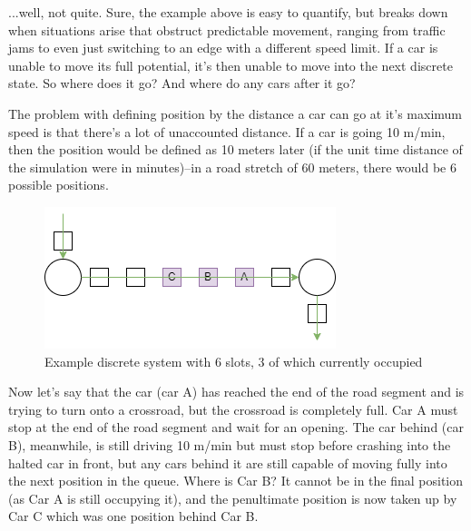 \par ...well, not quite.  Sure, the example above is easy to quantify, but breaks down when situations arise that obstruct predictable movement, ranging from traffic jams to even just switching to an edge with a different speed limit.  If a car is unable to move its full potential, it's then unable to move into the next discrete state.  So where does it go? And where do any cars after it go? \\

\par The problem with defining position by the distance a car can go at it's maximum speed is that there's a lot of unaccounted distance.  If a car is going 10 m/min, then the position would be defined as 10 meters later (if the unit time distance of the simulation were in minutes)--in a road stretch of 60 meters, there would be 6 possible positions.  \\

\begin{figure}[H]
    \centering
	\includegraphics[width=0.75\linewidth]{tex files/Figures/BasicDiscrete_Before.png}
	\caption[Discrete positions: example]{Example discrete system with 6 slots, 3 of which currently occupied}
	\label{fig:BasicDiscrete_before}
\end{figure}


\par Now let's say that the car (car A) has reached the end of the road segment and is trying to turn onto a crossroad, but the crossroad is completely full.  Car A must stop at the end of the road segment and wait for an opening.  The car behind (car B), meanwhile, is still driving 10 m/min but must stop before crashing into the halted car in front, but any cars behind it are still capable of moving fully into the next position in the queue.  Where is Car B?  It cannot be in the final position (as Car A is still occupying it), and the penultimate position is now taken up by Car C which was one position behind Car B.\\


